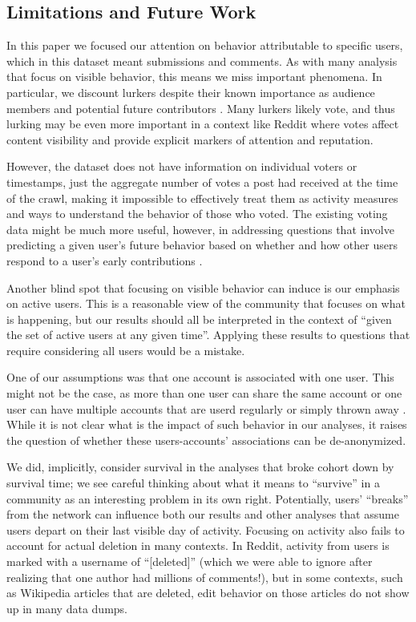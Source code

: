\subsection{Limitations and Future Work}

In this paper we focused our attention on behavior attributable to specific users, which in this dataset meant submissions and comments.  As with many analysis that focus on visible behavior, this means we miss important phenomena.  In particular, we discount lurkers despite their known importance as audience members \cite{Nonnecke2003} and potential future contributors \cite{Ridings2006}.  Many lurkers likely vote, and thus lurking may be even more important in a context like Reddit where votes affect content visibility and provide explicit markers of attention and reputation.  

However, the dataset does not have information on individual voters or timestamps, just the aggregate number of votes a post had received at the time of the crawl, making it impossible to effectively treat them as activity measures and ways to understand the behavior of those who voted.  The existing voting data might be much more useful, however, in addressing questions that involve predicting a given user's future behavior based on whether and how other users respond to a user's early contributions \cite{Joyce2006,Sarkar2012}.

Another blind spot that focusing on visible behavior can induce is our emphasis on active users.  This is a reasonable view of the community that focuses on what is happening, but our results should all be interpreted in the context of ``given the set of active users at any given time''.  Applying these results to questions that require considering all users would be a mistake.  

One of our assumptions was that one account is associated with one user. This might not be the case, as more than one user can share the same account \cite{Lampinen2014} or one user can have multiple accounts that are userd regularly or simply thrown away \cite{Bergstrom2011}. While it is not clear what is the impact of such behavior in our analyses, it raises the question of whether these users-accounts' associations can be de-anonymized.

We did, implicitly, consider survival in the analyses that broke cohort down by survival time; we see careful thinking about what it means to ``survive'' in a community as an interesting problem in its own right.  Potentially, users' ``breaks'' from the network can influence both our results and other analyses that assume users depart on their last visible day of activity. 
Focusing on activity also fails to account for actual deletion in many contexts.  In Reddit, activity from users is marked with a username of ``[deleted]'' (which we were able to ignore after realizing that one author had millions of comments!), but in some contexts, such as Wikipedia articles that are deleted, edit behavior on those articles do not show up in many data dumps.

